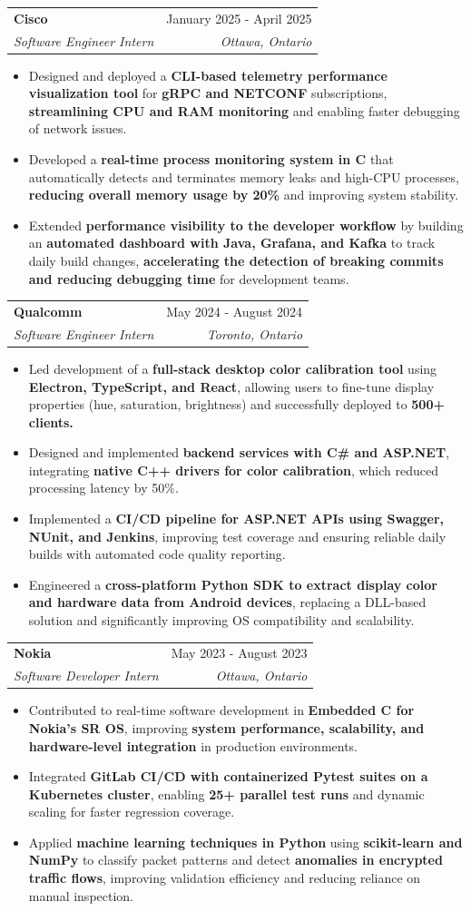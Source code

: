\documentclass[letterpaper,11pt,usenames,dvipsnames]{article}
\makeatletter
\newcommand{\resumeItem}[1]{
  \item\small{
    {#1 \vspace{-2.41pt}}
  }
}
\newcommand{\resumeSubheading}[4]{
  \vspace{-1.5pt}\item
    \begin{tabular*}{0.97\textwidth}[t]{l@{\extracolsep{\fill}}r}
      \textbf{#1} & #2 \\
      \textit{\small#3} & \textit{\small #4 } \\
    \end{tabular*}\vspace{-7pt}
}
\newcommand{\resumeItemListStart}{\begin{itemize}[leftmargin=0.15in]}
\newcommand{\resumeItemListEnd}{\end{itemize}\vspace{-7pt}}
\makeatother
\begin{document}
    \resumeSubheading
        {Cisco}{January 2025 - April 2025}
        {Software Engineer Intern}{Ottawa, Ontario}
         \resumeItemListStart
            \resumeItem{Designed and deployed a \textbf{CLI-based telemetry performance visualization tool} for \textbf{gRPC and NETCONF} subscriptions, \textbf{streamlining CPU and RAM monitoring} and enabling faster debugging of network issues.}
            \resumeItem{Developed a \textbf{real-time process monitoring system in C} that automatically detects and terminates memory leaks and high-CPU processes, \textbf{reducing overall memory usage by 20\%} and improving system stability.}
            \resumeItem{Extended \textbf{performance visibility to the developer workflow} by building an \textbf{automated dashboard with Java, Grafana, and Kafka} to track daily build changes,\textbf{ accelerating the detection of breaking commits and reducing debugging time} for development teams.}
        \resumeItemListEnd
    
    \resumeSubheading
        {Qualcomm}{May 2024 - August 2024}
        {Software Engineer Intern}{Toronto, Ontario}
         \resumeItemListStart
            \resumeItem{Led development of a \textbf{full-stack desktop color calibration tool} using \textbf{Electron, TypeScript, and React}, allowing users to fine-tune display properties (hue, saturation, brightness) and successfully deployed to \textbf{500+ clients.}}
            \resumeItem{Designed and implemented \textbf{backend services with C\# and ASP.NET}, integrating \textbf{native C++ drivers for color calibration}, which reduced processing latency by 50\%.}
            \resumeItem{Implemented a \textbf{CI/CD pipeline for ASP.NET APIs using Swagger, NUnit, and Jenkins}, improving test coverage and ensuring reliable daily builds with automated code quality reporting.}
            \resumeItem{Engineered a \textbf{cross-platform Python SDK to extract display color and hardware data from Android devices}, replacing a DLL-based solution and significantly improving OS compatibility and scalability.}
        \resumeItemListEnd
    
    \resumeSubheading
      {Nokia}{May 2023 - August 2023}
      {Software Developer Intern}{Ottawa, Ontario}
          \resumeItemListStart
            \resumeItem{Contributed to real-time software development in \textbf{Embedded C for Nokia’s SR OS}, improving \textbf{system performance, scalability, and hardware-level integration} in production environments.}
            \resumeItem{Integrated \textbf{GitLab CI/CD with containerized Pytest suites on a Kubernetes cluster}, enabling \textbf{25+ parallel test runs} and dynamic scaling for faster regression coverage.}
            \resumeItem{Applied \textbf{machine learning techniques in Python} using \textbf{scikit-learn and NumPy} to classify packet patterns and detect \textbf{anomalies in encrypted traffic flows}, improving validation efficiency and reducing reliance on manual inspection.}
            \resumeItemListEnd
    
\end{document}
